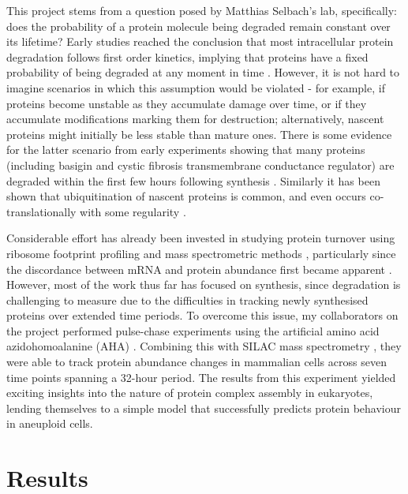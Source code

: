 \documentclass[a4paper,11pt,twoside,openright]{scrbook}
\begin{document}
This project stems from a question posed by Matthias Selbach's lab, specifically: does the probability of a protein molecule being degraded remain constant over its lifetime? Early studies reached the conclusion that most intracellular protein degradation follows first order kinetics, implying that proteins have a fixed probability of being degraded at any moment in time \cite{Schimke1970,Goldberg1974}. However, it is not hard to imagine scenarios in which this assumption would be violated - for example, if proteins become unstable as they accumulate damage over time, or if they accumulate modifications marking them for destruction; alternatively, nascent proteins might initially be less stable than mature ones. There is some evidence for the latter scenario from early experiments showing that many proteins (including basigin and cystic fibrosis transmembrane conductance regulator) are degraded within the first few hours following synthesis \cite{Wheatley1980,Tyler2012,Ward1994}. Similarly it has been shown that ubiquitination of nascent proteins is common, and even occurs co-translationally with some regularity \cite{Kim2011,Wang2013}.

Considerable effort has already been invested in studying protein turnover using ribosome footprint profiling and mass spectrometric methods  \cite{Ingolia2009,Ingolia2011,Doherty2009,Schwanhausser2011,Kristensen2013}, particularly since the discordance between mRNA and protein abundance first became apparent \cite{Gygi1999a,Chen2002}. However, most of the work thus far has focused on synthesis, since degradation is challenging to measure due to the difficulties in tracking newly synthesised proteins over extended time periods. To overcome this issue, my collaborators on the project performed pulse-chase experiments using the artificial amino acid azidohomoalanine (AHA) \cite{Kiick2002,Dieterich2006}. Combining this with SILAC mass spectrometry \cite{Ong2002a}, they were able to track protein abundance changes in mammalian cells across seven time points spanning a 32-hour period. The results from this experiment yielded exciting insights into the nature of protein complex assembly in eukaryotes, lending themselves to a simple model that successfully predicts protein behaviour in aneuploid cells.

\section{Results}
\end{document}
